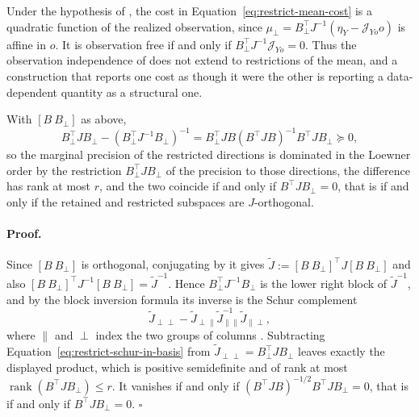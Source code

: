 Under the hypothesis of , the cost in Equation~\eqref{eq:restrict-mean-cost} is a quadratic function of the realized observation, since $\mu_\perp=B_\perp^\top J^{-1}(\eta_Y-\mathcal J_{Yo}o)$ is affine in $o$. It is observation free if and only if $B_\perp^\top J^{-1}\mathcal J_{Yo}=0$. Thus the observation independence of  does not extend to restrictions of the mean, and a construction that reports one cost as though it were the other is reporting a data-dependent quantity as a structural one. 

With $[B\ B_\perp]$ as above,
\begin{equation}
B_\perp^\top JB_\perp-\left(B_\perp^\top J^{-1}B_\perp\right)^{-1}
=B_\perp^\top JB\left(B^\top JB\right)^{-1}B^\top JB_\perp
\succeq0,
\label{eq:restrict-marginal-vs-restricted}
\end{equation}
so the marginal precision of the restricted directions is dominated in the Loewner order by the restriction $B_\perp^\top JB_\perp$ of the precision to those directions, the difference has rank at most $r$, and the two coincide if and only if $B^\top JB_\perp=0$, that is if and only if the retained and restricted subspaces are $J$-orthogonal. 

\paragraph{Proof.}
Since $[B\ B_\perp]$ is orthogonal, conjugating by it gives $\widetilde J:=[B\ B_\perp]^\top J[B\ B_\perp]$ and also $[B\ B_\perp]^\top J^{-1}[B\ B_\perp]=\widetilde J^{-1}$. Hence $B_\perp^\top J^{-1}B_\perp$ is the lower right block of $\widetilde J^{-1}$, and by the block inversion formula its inverse is the Schur complement
\begin{equation}
\widetilde J_{\perp\perp}
-\widetilde J_{\perp\parallel}\widetilde J_{\parallel\parallel}^{-1}\widetilde J_{\parallel\perp},
\label{eq:restrict-schur-in-basis}
\end{equation}
where $\parallel$ and $\perp$ index the two groups of columns \citep{Zhang2005Schur}. Subtracting Equation~\eqref{eq:restrict-schur-in-basis} from $\widetilde J_{\perp\perp}=B_\perp^\top JB_\perp$ leaves exactly the displayed product, which is positive semidefinite and of rank at most $\operatorname{rank}(B^\top JB_\perp)\leq r$. It vanishes if and only if $(B^\top JB)^{-1/2}B^\top JB_\perp=0$, that is if and only if $B^\top JB_\perp=0$. $\square$


